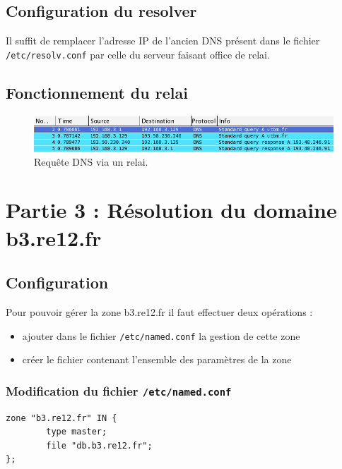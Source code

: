 \documentclass[12pt,a4paper,notitlepage]{article}
\begin{document}
\subsection{Configuration du resolver}
Il suffit de remplacer l'adresse IP de l'ancien DNS présent dans le fichier \texttt{/etc/resolv.conf} par celle du serveur faisant office de relai. 

\subsection{Fonctionnement du relai}

\begin{figure}[!h]
\begin{center}
\includegraphics[scale=0.61]{capture-via-relai}
\caption{Requête DNS via un relai.}
\label{fig:da}
\end{center}
\end{figure}



\section{Partie 3 : Résolution du domaine b3.re12.fr}

\subsection{Configuration}

Pour pouvoir gérer la zone b3.re12.fr il faut effectuer deux opérations :
\begin{itemize}
\item ajouter dans le fichier \texttt{/etc/named.conf} la gestion de cette zone
\item créer le fichier contenant l'ensemble des paramètres de la zone
\end{itemize}

\bigskip

\subsubsection{Modification du fichier \texttt{/etc/named.conf}}

\begin{lstlisting}
zone "b3.re12.fr" IN {
        type master;
        file "db.b3.re12.fr";
};
\end{lstlisting}
\end{document}
